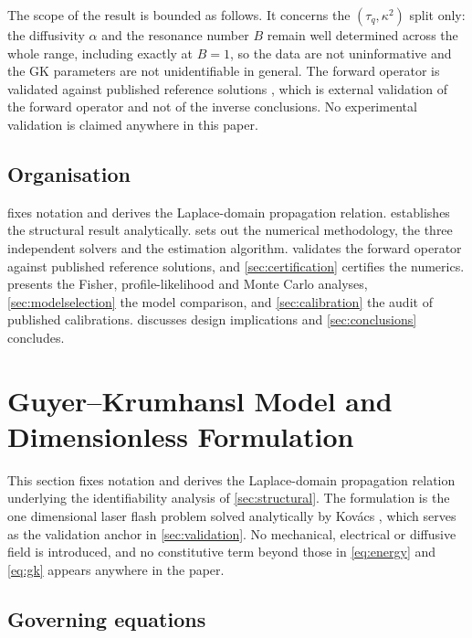 \documentclass[preprint,12pt,a4paper]{elsarticle}
\theoremstyle{plain}
\theoremstyle{definition}
\theoremstyle{remark}
\newcommand{\tq}{\tau_{q}}
\newcommand{\kk}{\kappa^{2}}
\newcommand{\Bnum}{B}
\begin{document}
The scope of the result is bounded as follows. It concerns the
$(\tq,\kk)$ split only: the diffusivity $\alpha$ and the resonance number $\Bnum$
remain well determined across the whole range, including exactly at $\Bnum=1$, so
the data are not uninformative and the GK parameters are not unidentifiable in
general. The forward operator is validated against published reference solutions
\cite{Kovacs2018}, which is external validation of the forward operator and not
of the inverse conclusions. No experimental validation is claimed anywhere in
this paper.

\subsection{Organisation}

 fixes notation and derives the Laplace-domain propagation
relation.  establishes the structural result analytically.
 sets out the numerical methodology, the three independent
solvers and the estimation algorithm.  validates the
forward operator against published reference solutions, and
\cref{sec:certification} certifies the numerics. 
presents the Fisher, profile-likelihood and Monte Carlo analyses,
\cref{sec:modelselection} the model comparison, and \cref{sec:calibration} the audit of
published calibrations.  discusses design implications and
\cref{sec:conclusions} concludes.

\section{Guyer--Krumhansl Model and Dimensionless Formulation}
\label{sec:model}

This section fixes notation and derives the Laplace-domain propagation
relation underlying the identifiability analysis of \cref{sec:structural}.
The formulation is the one dimensional laser flash
problem solved analytically by Kov\'acs \cite{Kovacs2018}, which serves as the
validation anchor in \cref{sec:validation}. No mechanical, electrical or
diffusive field is introduced, and no constitutive term beyond those in
\eqref{eq:energy} and \eqref{eq:gk} appears anywhere in the paper.

\subsection{Governing equations}
\label{sec:model-governing}
\end{document}
